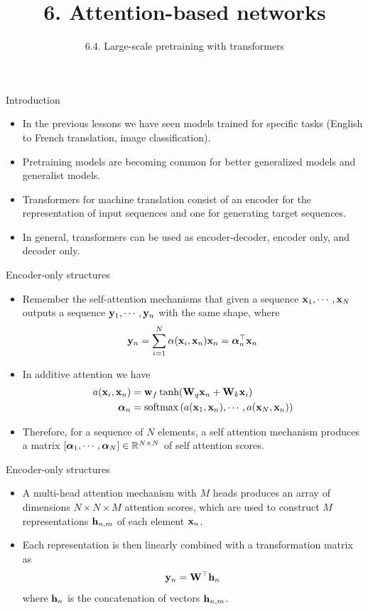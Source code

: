 \documentclass{beamer}
\title{6. Attention-based networks}
\subtitle{6.4. Large-scale pretraining with transformers}
\begin{document}
\maketitle


\begin{frame}{Introduction}
\begin{itemize}
\item In the previous lessons we have seen models trained for specific tasks (English to French translation, image classification).
\item Pretraining models are becoming common for better generalized models and generalist models. 
\item Transformers for machine translation consist of an encoder for the representation of input sequences and one for generating target sequences.
\item In general, transformers can be used as encoder-decoder, encoder only, and decoder only. 
\end{itemize}
\end{frame}
\begin{frame}{Encoder-only structures}
\begin{itemize}
    \item Remember the self-attention mechanisms that given a sequence ${\bf x}_1, \cdots, {\bf x}_N$ outputs a sequence ${\bf y}_1, \cdots, {\bf y}_n$ with the same shape, where 
    \begin{equation}
        {\bf y}_n = \sum_{i=1}^N \alpha({\bf x}_i,{\bf x}_n){\bf x}_n = {\boldsymbol \alpha}_n^\top {\bf x}_n
    \end{equation}
    \item In additive attention we have 
    \begin{equation}
    \begin{split}
        a({\bf x}_i,{\bf x}_n) & = {\bf w}_f \tanh({\bf W}_q{\bf x}_n+{\bf W}_k {\bf x}_i)\\
        {\boldsymbol \alpha}_n & = \text{softmax}\left( a({\bf x}_1,{\bf x}_n), \cdots, a({\bf x}_N,{\bf x}_n) \right)
    \end{split}
    \end{equation}
\item Therefore, for a sequence of $N$ elements, a self attention mechanism produces a matrix $\left[{\boldsymbol \alpha}_1, \cdots, {\boldsymbol \alpha}_N\right] \in \mathbb{R}^{N\times N}$ of self attention scores.  
\end{itemize}
\end{frame}
\begin{frame}{Encoder-only structures}
    \begin{itemize}
        \item A multi-head attention mechanism with $M$ heads produces an array of dimensions $N\times N \times M$ attention scores, which are used to construct $M$ representations ${\bf h}_{n,m}$ of each element ${\bf x}_n$. 
        \item Each representation is then linearly combined with a transformation matrix as 
        \begin{equation}
            {\bf y}_n = {\bf W}^\top {\bf h}_n
        \end{equation}
where ${\bf h}_n$ is the concatenation of vectors ${\bf h}_{n,m}$.        
       
    \end{itemize}
\end{frame}
\end{document}
